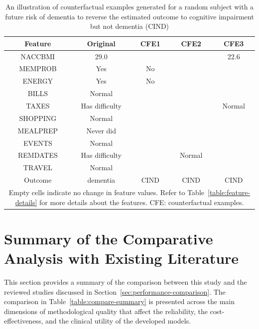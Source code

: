 \begin{table}[H]
    \centering
    \caption{An illustration of counterfactual examples generated for a random subject with a future risk of dementia to reverse the estimated outcome to cognitive impairment but not dementia (\acrshort{CIND})}
    \begin{tabular}{|c|c|c|c|c|}
    \hline
        \textbf{Feature} & \textbf{Original} & \textbf{CFE1} & \textbf{CFE2} & \textbf{CFE3} \\ \hline
        NACCBMI & 29.0 & ~ & ~ & 22.6 \\ \hline
        MEMPROB & Yes & No & ~ & ~ \\ \hline
        ENERGY & Yes & No & ~ & ~ \\ \hline
        BILLS & Normal & ~ & ~ & ~ \\ \hline
        TAXES & Has difficulty & ~ & ~ & Normal \\ \hline
        SHOPPING & Normal & ~ & ~ & ~ \\ \hline
        MEALPREP & Never did & ~ & ~ & ~ \\ \hline
        EVENTS & Normal & ~ & ~ & ~ \\ \hline
        REMDATES & Has difficulty & ~ & Normal & ~ \\ \hline
        TRAVEL & Normal & ~ & ~ & ~ \\ \hline
        Outcome & dementia & CIND & CIND & CIND \\ \hline
    \multicolumn{5}{p{280pt}}{\footnotesize Empty cells indicate no change in feature values. Refer to Table~\ref{table:feature-details} for more details about the features. CFE: counterfactual examples.}
    \end{tabular}
    \label{table:cfe-adni-task4-apdx}
\end{table}

\section{Summary of the Comparative Analysis with Existing Literature}\label{sec:compare-summary-apdx}
This section provides a summary of the comparison between this study and the reviewed studies discussed in Section~\ref{sec:performance-comparison}. The comparison in Table~\ref{table:compare-summary} is presented across the main dimensions of methodological quality that affect the reliability, the cost-effectiveness, and the clinical utility of the developed models.

